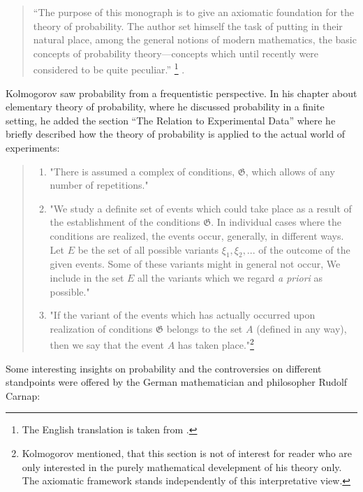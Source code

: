 \documentclass[
]{report}
\theoremstyle{definition}
\theoremstyle{definition}
\begin{document}
\begin{quote}
“The purpose of this monograph is to give an axiomatic foundation for the theory of probability. The author set himself the task of putting in their natural place, among the general notions of modern mathematics, the basic concepts of probability theory—concepts which until recently were considered to be quite peculiar.” \footnote{The English translation is taken from \cite[p. 15]{a_n_kolmogorov_foundations_1950}.} \cite[p.15]{noauthor_kolmogoroff_nodate}. 
\end{quote}

Kolmogorov saw probability from a frequentistic perspective. In his
chapter about elementary theory of probability, where he discussed
probability in a finite setting, he added the section ``The Relation to
Experimental Data'' where he briefly described how the theory of
probability is applied to the actual world of experiments:

\begin{quote}
\begin{enumerate}[label=\arabic*)]
  \item "There is assumed a complex of conditions, $\mathfrak{G}$, which allows of any number of repetitions."
  \item "We study a definite set of events which could take place as a result of the establishment of the conditions $\mathfrak{G}$. In individual cases where the conditions are realized, the events occur, generally, in different ways. Let $E$ be the set of all possible variants $\xi_1, \xi_2, ...$ of the outcome of the given events. Some of these variants might in general not occur, We include in the set $E$ all the variants which we regard \textit{a priori} as possible."
  \item "If the variant of the events which has actually occurred upon realization of conditions $\mathfrak{G}$ belongs to the set $A$ (defined in any way), then we say that the event $A$ has taken place."\footnote{Kolmogorov mentioned, that this section is not of interest for reader who are only interested in the purely mathematical develepment of his theory only. The axiomatic framework stands independently of this interpretative view.}
\end{enumerate}
\end{quote}

Some interesting insights on probability and the controversies on
different standpoints were offered by the German mathematician and
philosopher Rudolf Carnap:
\end{document}
